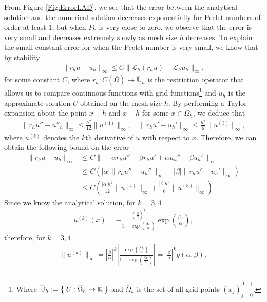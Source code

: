 \documentclass[a4paper,11pt]{article}
\theoremstyle{break}
\theoremstyle{break2}
\theoremstyle{break}
\theoremstyle{break2}
\newcommand{\R}{\mathbb{R}}
\newcommand{\cL}{\mathcal{L}}
\begin{document}
\noindent
From Figure \ref{Fig:ErrorLAD}, we see that the error between the analytical solution and the numerical solution decreases exponentially for Peclet numbers of order at least 1, but when $ Pe $ is very close to zero, we observe that the error is very small and decreases extremely slowly as mesh size $ h $ decreases. To explain the small constant error for when the Peclet number is very small, we know that by stability
\begin{align*}
\|r_hu - u_h\|_{\infty} \leq C \|\cL_h(r_h u) - \cL_h u_h \|_{\infty},
\end{align*}
for some constant $ C $, where $ r_h : C(\overline{\Omega}) \to \overline{\mathbb{U}}_h $ is the restriction operator that allows us to compare continuous functions with grid functions\footnote{Where $ \overline{\mathbb{U}}_h := \Set{U : \overline{\Omega}_h \to \R} $ and $ \overline{\Omega}_h $ is the set of all grid points $ (x_j)_{j=0}^{J+1} $.} and $ u_h $ is the approximate solution $ U $ obtained on the mesh size $ h $. By performing a Taylor expansion about the point $ x + h $ and $ x - h $ for some $ x \in \Omega_h $, we deduce that
\begin{align*}
\|r_h u'' - u''_h\|_{\infty} \leq \frac{h^2}{12}\|u^{(4)}\|_{\infty},\quad \|r_hu' - u_h'\|_{\infty} \leq \frac{h^2}{6}\|u^{(3)}\|_{\infty},
\end{align*}
where $ u^{(k)} $ denotes the $ k $th derivative of $ u $ with respect to $ x $.
Therefore, we can obtain the following bound on the error
\begin{align*}
\|r_h u - u_h\|_{\infty} &\leq C\|-\alpha r_h u'' + \beta r_h u' + \alpha u_h'' - \beta u_h'\|_{\infty} \\
&\leq C\left(|\alpha|\|r_h u'' - u_h''\|_{\infty} + |\beta|\|r_h u' - u_h' \|_{\infty}\right) \\
&\leq C\left(\frac{|\alpha|h^2}{12}\|u^{(4)}\|_{\infty} + \frac{|\beta|h^2}{6}\|u^{(3)}\|_{\infty}\right).
\end{align*}
Since we know the analytical solution, for $ k = 3,4 $
\begin{align*}
u^{(k)}(x) =-\frac{\left(\frac{\beta}{\alpha}\right)^k}{1 - \exp\left(\frac{\beta L}{\alpha}\right)}\exp\left(\frac{\beta x}{\alpha}\right),
\end{align*}
therefore, for $ k = 3,4 $
\begin{align*}
\|u^{(k)}\|_{\infty} = \left|\frac{\beta}{\alpha}\right|^{k}\left|\frac{\exp\left(\frac{\beta L}{\alpha}\right)}{1 - \exp\left(\frac{\beta L}{\alpha}\right)}\right| =\left|\frac{\beta}{\alpha}\right|^{k} g(\alpha,\beta),
\end{align*}
\end{document}
